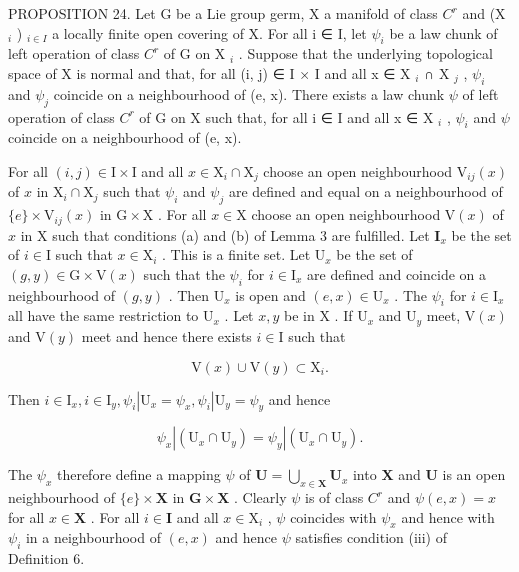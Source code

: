 PROPOSITION 24. Let G be a Lie group germ, X a manifold of class \(C^{r}\) and (X \(_{i}\) ) \(_{i \in I}\) a locally finite open covering of X. For all i ∈ I, let \(\psi_{i}\) be a law chunk of left operation of class \(C^{r}\) of G on X \(_{i}\) . Suppose that the underlying topological space of X is normal and that, for all (i, j) ∈ I × I and all x ∈ X \(_{i}\) ∩ X \(_{j}\) , \(\psi_{i}\) and \(\psi_{j}\) coincide on a neighbourhood of (e, x). There exists a law chunk \(\psi\) of left operation of class \(C^{r}\) of G on X such that, for all i ∈ I and all x ∈ X \(_{i}\) , \(\psi_{i}\) and \(\psi\) coincide on a neighbourhood of (e, x).

For all \((i,j)\in \mathrm{I}\times \mathrm{I}\) and all \(x\in \mathrm{X}_i\cap \mathrm{X}_j\) choose an open neighbourhood \(\mathrm{V}_{ij}(x)\) of \(x\) in \(\mathrm{X}_i\cap \mathrm{X}_j\) such that \(\psi_i\) and \(\psi_j\) are defined and equal on a neighbourhood of \(\{e\} \times \mathrm{V}_{ij}(x)\) in \(\mathrm{G}\times \mathrm{X}\) . For all \(x\in \mathrm{X}\) choose an open neighbourhood \(\mathrm{V}(x)\) of \(x\) in \(\mathrm{X}\) such that conditions (a) and (b) of Lemma 3 are fulfilled. Let \(\mathbf{I}_x\) be the set of \(i\in \mathrm{I}\) such that \(x\in \mathrm{X}_i\) . This is a finite set. Let \(\mathrm{U}_x\) be the set of \((g,y)\in \mathrm{G}\times \mathrm{V}(x)\) such that the \(\psi_i\) for \(i\in \mathrm{I}_x\) are defined and coincide on a neighbourhood of \((g,y)\) . Then \(\mathrm{U}_x\) is open and \((e,x)\in \mathrm{U}_x\) . The \(\psi_i\) for \(i\in \mathrm{I}_x\) all have the same restriction to \(\mathrm{U}_x\) . Let \(x,y\) be in \(\mathrm{X}\) . If \(\mathrm{U}_x\) and \(\mathrm{U}_y\) meet, \(\mathrm{V}(x)\) and \(\mathrm{V}(y)\) meet and hence there exists \(i\in \mathrm{I}\) such that

\[
\mathrm{V} (x) \cup \mathrm{V} (y) \subset \mathrm{X} _ {i}.
\]

Then \(i \in \mathrm{I}_x, i \in \mathrm{I}_y, \psi_i | \mathrm{U}_x = \psi_x, \psi_i | \mathrm{U}_y = \psi_y\) and hence

\[
\psi_ {x} | (\mathrm{U} _ {x} \cap \mathrm{U} _ {y}) = \psi_ {y} | (\mathrm{U} _ {x} \cap \mathrm{U} _ {y}).
\]

The \(\psi_x\) therefore define a mapping \(\psi\) of \(\mathbf{U} = \bigcup_{x\in \mathbf{X}}\mathbf{U}_x\) into \(\mathbf{X}\) and \(\mathbf{U}\) is an open neighbourhood of \(\{e\} \times \mathbf{X}\) in \(\mathbf{G}\times \mathbf{X}\) . Clearly \(\psi\) is of class \(C^r\) and \(\psi (e,x) = x\) for all \(x\in \mathbf{X}\) . For all \(i\in \mathbf{I}\) and all \(x\in \mathrm{X}_i\) , \(\psi\) coincides with \(\psi_x\) and hence with \(\psi_i\) in a neighbourhood of \((e,x)\) and hence \(\psi\) satisfies condition (iii) of Definition 6.

